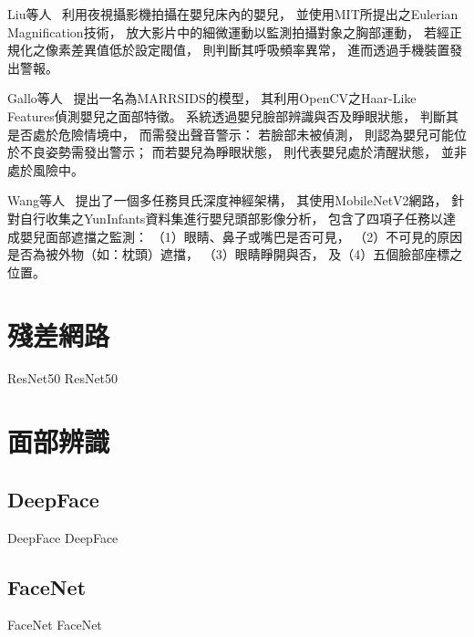 \documentclass[class=NCU_thesis, crop=false]{standalone}
\begin{document}
Liu等人~\cite{liuVideoBasedIoTBabyMonitorForSIDSPrevention2017}
利用夜視攝影機拍攝在嬰兒床內的嬰兒，
並使用MIT所提出之Eulerian Magnification技術，
放大影片中的細微運動以監測拍攝對象之胸部運動，
若經正規化之像素差異值低於設定閥值，
則判斷其呼吸頻率異常，
進而透過手機裝置發出警報。

Gallo等人~\cite{galloMARRSIDS2019}
提出一名為MARRSIDS的模型，
其利用OpenCV之Haar-Like Features偵測嬰兒之面部特徵。
系統透過嬰兒臉部辨識與否及睜眼狀態，
判斷其是否處於危險情境中，
而需發出聲音警示：
若臉部未被偵測，
則認為嬰兒可能位於不良姿勢需發出警示；
而若嬰兒為睜眼狀態，
則代表嬰兒處於清醒狀態，
並非處於風險中。

Wang等人~\cite{WangAMultiTaskBayesianDeepNeuralNetForDetectingLifeThreateningInfantIncidentsFromHeadImages2019}
提出了一個多任務貝氏深度神經架構，
其使用MobileNetV2網路，
針對自行收集之YunInfants資料集進行嬰兒頭部影像分析，
包含了四項子任務以達成嬰兒面部遮擋之監測：
（1）眼睛、鼻子或嘴巴是否可見，
（2）不可見的原因是否為被外物（如：枕頭）遮擋，
（3）眼睛睜開與否，
及（4）五個臉部座標之位置。





\section{殘差網路}
ResNet50 ResNet50

\section{面部辨識}
\subsection{DeepFace}
DeepFace DeepFace

\subsection{FaceNet}
FaceNet FaceNet
\end{document}
